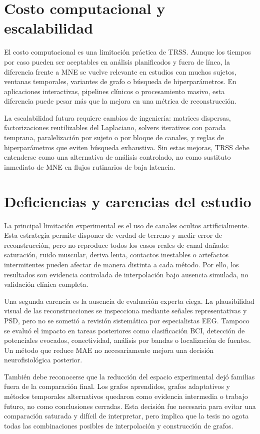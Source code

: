 \section{Costo computacional y escalabilidad}

El costo computacional es una limitación práctica de TRSS. Aunque los tiempos por caso pueden ser aceptables en análisis planificados y fuera de línea, la diferencia frente a MNE se vuelve relevante en estudios con muchos sujetos, ventanas temporales, variantes de grafo o búsqueda de hiperparámetros. En aplicaciones interactivas, pipelines clínicos o procesamiento masivo, esta diferencia puede pesar más que la mejora en una métrica de reconstrucción.

La escalabilidad futura requiere cambios de ingeniería: matrices dispersas, factorizaciones reutilizables del Laplaciano, solvers iterativos con parada temprana, paralelización por sujeto o por bloque de canales, y reglas de hiperparámetros que eviten búsqueda exhaustiva. Sin estas mejoras, TRSS debe entenderse como una alternativa de análisis controlado, no como sustituto inmediato de MNE en flujos rutinarios de baja latencia.

\section{Deficiencias y carencias del estudio}

La principal limitación experimental es el uso de canales ocultos artificialmente. Esta estrategia permite disponer de verdad de terreno y medir error de reconstrucción, pero no reproduce todos los casos reales de canal dañado: saturación, ruido muscular, deriva lenta, contactos inestables o artefactos intermitentes pueden afectar de manera distinta a cada método. Por ello, los resultados son evidencia controlada de interpolación bajo ausencia simulada, no validación clínica completa.

Una segunda carencia es la ausencia de evaluación experta ciega. La plausibilidad visual de las reconstrucciones se inspecciona mediante señales representativas y PSD, pero no se sometió a revisión sistemática por especialistas EEG. Tampoco se evaluó el impacto en tareas posteriores como clasificación BCI, detección de potenciales evocados, conectividad, análisis por bandas o localización de fuentes. Un método que reduce MAE no necesariamente mejora una decisión neurofisiológica posterior.

También debe reconocerse que la reducción del espacio experimental dejó familias fuera de la comparación final. Los grafos aprendidos, grafos adaptativos y métodos temporales alternativos quedaron como evidencia intermedia o trabajo futuro, no como conclusiones cerradas. Esta decisión fue necesaria para evitar una comparación saturada y difícil de interpretar, pero implica que la tesis no agota todas las combinaciones posibles de interpolación y construcción de grafos.

